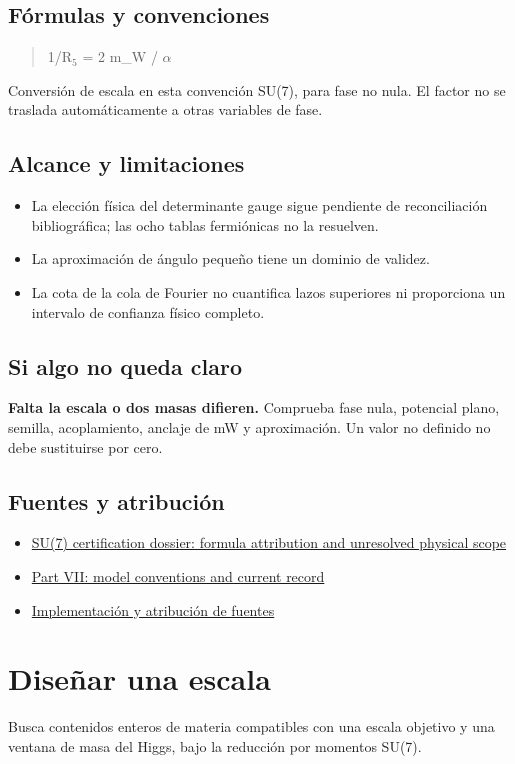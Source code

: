 \documentclass[11pt,a4paper]{article}
\begin{document}
\subsection*{Fórmulas y convenciones}
\begin{quote}1/R\ensuremath{{}_{5}} = 2 m\_W / \ensuremath{\alpha}\end{quote}
Conversión de escala en esta convención SU(7), para fase no nula. El factor no se traslada automáticamente a otras variables de fase.

\subsection*{Alcance y limitaciones}
\begin{itemize}
\item La elección física del determinante gauge sigue pendiente de reconciliación bibliográfica; las ocho tablas fermiónicas no la resuelven.
\item La aproximación de ángulo pequeño tiene un dominio de validez.
\item La cota de la cola de Fourier no cuantifica lazos superiores ni proporciona un intervalo de confianza físico completo.
\end{itemize}
\subsection*{Si algo no queda claro}
\textbf{Falta la escala o dos masas difieren.} Comprueba fase nula, potencial plano, semilla, acoplamiento, anclaje de mW y aproximación. Un valor no definido no debe sustituirse por cero.

\subsection*{Fuentes y atribución}
\begin{itemize}
\item \href{https://karlesmarin.github.io/ghu-explorer/docs/su7-certification.html}{SU(7) certification dossier: formula attribution and unresolved physical scope}
\item \href{https://karlesmarin.github.io/ghu-explorer/papers/part-vii/index.html}{Part VII: model conventions and current record}
\item \href{https://github.com/karlesmarin/ghu-lab/blob/main/src/sections/hierarchy_section.js}{Implementación y atribución de fuentes}
\end{itemize}
\section{Diseñar una escala}
Busca contenidos enteros de materia compatibles con una escala objetivo y una ventana de masa del Higgs, bajo la reducción por momentos SU(7).
\end{document}
